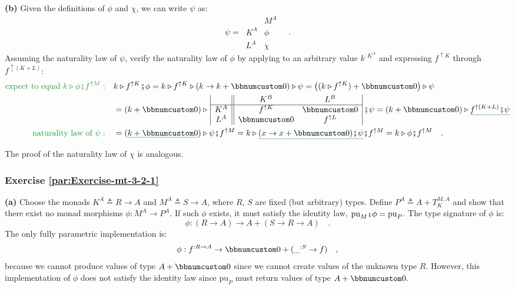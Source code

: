 \textbf{(b)} Given the definitions of $\phi$ and $\chi$, we can
write $\psi$ as:
\[
\psi=\,\begin{array}{|c||c|}
 & M^{A}\\
\hline K^{A} & \phi\\
L^{A} & \chi
\end{array}\quad.
\]
Assuming the naturality law of $\psi$, verify the naturality law
of $\phi$ by applying to an arbitrary value $k^{:K^{A}}$ and expressing
$f^{\uparrow K}$ through $f^{\uparrow(K+L)}$: 
\begin{align*}
{\color{greenunder}\text{expect to equal }k\triangleright\phi\bef f^{\uparrow M}:}\quad & k\triangleright f^{\uparrow K}\bef\phi=k\triangleright f^{\uparrow K}\triangleright(k\rightarrow k+\bbnum 0)\triangleright\psi=\big((k\triangleright f^{\uparrow K})+\bbnum 0\big)\triangleright\psi\\
 & =(k+\bbnum 0)\triangleright\,\begin{array}{|c||cc|}
 & K^{B} & L^{B}\\
\hline K^{A} & f^{\uparrow K} & \bbnum 0\\
L^{A} & \bbnum 0 & f^{\uparrow L}
\end{array}\,\bef\psi=(k+\bbnum 0)\triangleright\gunderline{f^{\uparrow(K+L)}\bef\psi}\\
{\color{greenunder}\text{naturality law of }\psi:}\quad & =(\gunderline{k+\bbnum 0})\triangleright\psi\bef f^{\uparrow M}=k\triangleright\gunderline{(x\rightarrow x+\bbnum 0)\bef\psi}\bef f^{\uparrow M}=k\triangleright\phi\bef f^{\uparrow M}\quad.
\end{align*}

The proof of the naturality law of $\chi$ is analogous.

\subsubsection*{Exercise \ref{par:Exercise-mt-3-2-1}}

\textbf{(a)} Choose the monads $K^{A}\triangleq R\rightarrow A$ and
$M^{A}\triangleq S\rightarrow A$, where $R$, $S$ are fixed (but
arbitrary) types. Define $P^{A}\triangleq A+T_{K}^{M,A}$ and show
that there exist no monad morphisms $\phi:M^{A}\rightarrow P^{A}$.
If such $\phi$ exists, it must satisfy the identity law, $\text{pu}_{M}\bef\phi=\text{pu}_{P}$.
The type signature of $\phi$ is:
\[
\phi:(R\rightarrow A)\rightarrow A+(S\rightarrow R\rightarrow A)\quad.
\]
The only fully parametric implementation is:
\[
\phi:f^{:R\rightarrow A}\rightarrow\bbnum 0+(\_^{:S}\rightarrow f)\quad,
\]
because we cannot produce values of type $A+\bbnum 0$ since we cannot
create values of the unknown type $R$. However, this implementation
of $\phi$ does not satisfy the identity law since $\text{pu}_{P}$
must return values of type $A+\bbnum 0$.

